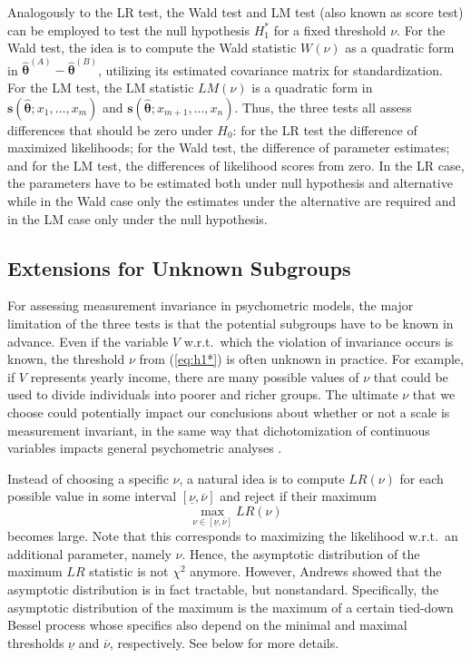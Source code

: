 \documentclass[man]{apa}
\begin{document}
Analogously to the LR test, the Wald test and LM test (also known as score test)
can be employed to test the null hypothesis $H_1^*$ for a fixed threshold $\nu$.
For the Wald test, the idea is to compute the Wald statistic $W(\nu)$ as a quadratic
form in $\hat {\bm \theta}^{(A)} - \hat {\bm \theta}^{(B)}$, utilizing its estimated
covariance matrix for standardization. For the LM test, the LM statistic
$\mathit{LM}(\nu)$ is a quadratic form in ${\bm s}(\hat {\bm \theta}; x_1, \dots, x_m)$
and ${\bm s}(\hat {\bm \theta}; x_{m+1}, \dots, x_n)$. Thus, the three tests all assess
differences that should be zero under $H_0$: for the LR test the difference of maximized
likelihoods; for the Wald test, the difference of parameter estimates; and for the
LM test, the differences of likelihood scores from zero. In the LR case, the parameters
have to be estimated both under null hypothesis and alternative while in the Wald case
only the estimates under the alternative are required and in the LM case only under the
null hypothesis.


\subsection{Extensions for Unknown Subgroups}

For assessing measurement invariance in psychometric models, the major limitation of
the three tests is that the potential subgroups have to be known in advance. 
Even if the variable $V$ w.r.t.\ which the violation of invariance occurs is
known, the threshold $\nu$ from (\ref{eq:h1*}) is often unknown in practice.
For example, if $V$ represents yearly income, there are many possible
values of $\nu$ that could be used to divide individuals into poorer and richer
groups.  The ultimate $\nu$ that we
choose could potentially impact our
conclusions about whether or not a scale is measurement invariant, 
in the same way that dichotomization of continuous variables impacts
general psychometric analyses \cite{MacZha02}.

Instead of choosing a specific $\nu$, a natural idea is to compute $\mathit{LR}(\nu)$
for each possible value in some interval $[\underline{\nu}, \overline{\nu}]$ and
reject if their maximum
\begin{equation} \label{eq:maxlr}
  \max_{\nu \in [\underline{\nu}, \overline{\nu}]} \mathit{LR}(\nu)
\end{equation}
becomes large. Note that this corresponds to maximizing the likelihood w.r.t.\
an additional parameter, namely $\nu$. Hence, the asymptotic distribution of the
maximum $\mathit{LR}$ statistic is not $\chi^2$ anymore. However, Andrews \citeyear{And93}
showed that the asymptotic distribution is in fact tractable, but nonstandard.
Specifically, the asymptotic distribution of the maximum is the maximum of a
certain tied-down Bessel process whose specifics also depend on the minimal
and maximal thresholds $\underline{\nu}$ and $\overline{\nu}$, respectively.
See below for more details.
\end{document}
